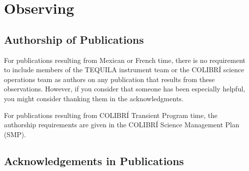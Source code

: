 \chapter{Observing}
\label{chapter:observing}

\section{Authorship of Publications}

For publications resulting from Mexican or French time, there is no requirement to include members of the TEQUILA instrument team or the COLIBRÍ science operations team as authors on any publication that results from these observations. However, if you consider that someone has been especially helpful, you might consider thanking them in the acknowledgments.

For publications resulting from COLIBRÍ Transient Program time, the authorship requirements are given in the COLIBRÍ Science Management Plan (SMP).

\section{Acknowledgements in Publications}

